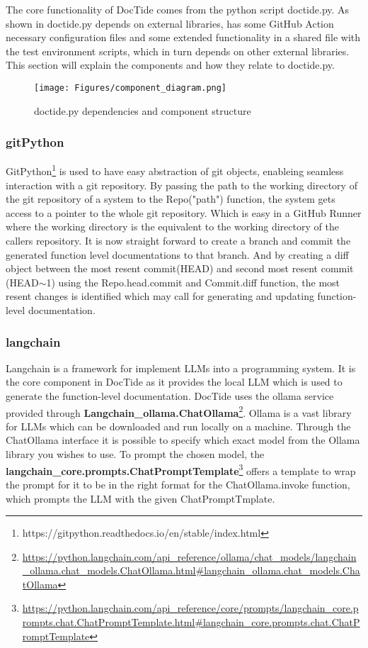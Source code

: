 The core functionality of DocTide comes from the python script doctide.py. As shown in  doctide.py depends on external libraries, has some GitHub Action necessary configuration files and some extended functionality in a shared file with the test environment scripts, which in turn depends on other external libraries. This section will explain the components and how they relate to doctide.py.

\begin{figure}[H]
\centering
\texttt{[image: Figures/component\_diagram.png]}
\caption{doctide.py dependencies and component structure}
\label{fig:components}
\end{figure}
\subsubsection{gitPython}
GitPython\footnote{https://gitpython.readthedocs.io/en/stable/index.html} is used to have easy abstraction of git objects, enableing seamless interaction with a git repository. By passing the path to the working directory of the git repository of a system to the Repo("path") function, the system gets access to a pointer to the whole git repository. Which is easy in a GitHub Runner where the working directory is the equivalent to the working directory of the callers repository. It is now straight forward to create a branch and commit the generated function level documentations to that branch. And by creating a diff object between the most resent commit(HEAD) and second most resent commit (HEAD\(\sim \)1) using the Repo.head.commit and Commit.diff function, the most resent changes is identified which may call for generating and updating function-level documentation.
\subsubsection{langchain}
Langchain is a framework for implement LLMs into a programming system. It is the core component in DocTide as it provides the local LLM which is used to generate the function-level documentation. DocTide uses the ollama service provided through \textbf{Langchain\_ollama.ChatOllama}\footnote{\url{https://python.langchain.com/api_reference/ollama/chat_models/langchain_ollama.chat_models.ChatOllama.html#langchain_ollama.chat_models.ChatOllama}}. Ollama is a vast library for LLMs which can be downloaded and run locally on a machine. Through the ChatOllama interface it is possible to specify which exact model from the Ollama library you wishes to use. To prompt the chosen model, the \textbf{langchain\_core.prompts.ChatPromptTemplate}\footnote{\url{https://python.langchain.com/api_reference/core/prompts/langchain_core.prompts.chat.ChatPromptTemplate.html#langchain_core.prompts.chat.ChatPromptTemplate}} offers a template to wrap the prompt for it to be in the right format for the ChatOllama.invoke function, which prompts the LLM with the given ChatPromptTmplate.

